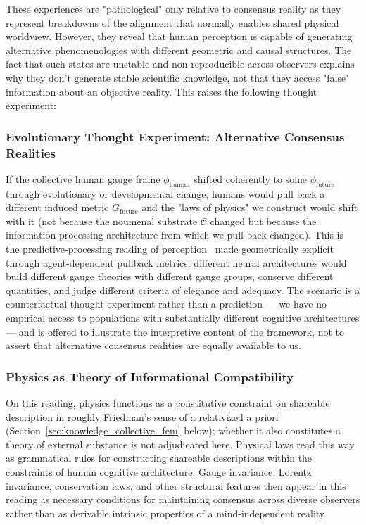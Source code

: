 \documentclass[11pt]{article}
\begin{document}
These experiences are "pathological" only relative to consensus reality as they represent breakdowns of the alignment that normally enables shared physical worldview. However, they reveal that human perception is capable of generating alternative phenomenologies with different geometric and causal structures. The fact that such states are unstable and non-reproducible across observers explains why they don't generate stable scientific knowledge, not that they access "false" information about an objective reality.  This raises the following thought experiment:

\subsubsection{Evolutionary Thought Experiment: Alternative Consensus Realities}

If the collective human gauge frame $\phi_{\text{human}}$ shifted coherently to some $\phi_{\text{future}}$ through evolutionary or developmental change, humans would pull back a different induced metric $G_{\text{future}}$ and the "laws of physics" we construct would shift with it (not because the noumenal substrate $\mathcal{C}$ changed but because the information-processing architecture from which we pull back changed). This is the predictive-processing reading of perception~\cite{Clark2016, Seth2021, Hoffman2019, hohwy2013predictive} made geometrically explicit through agent-dependent pullback metrics: different neural architectures would build different gauge theories with different gauge groups, conserve different quantities, and judge different criteria of elegance and adequacy. The scenario is a counterfactual thought experiment rather than a prediction — we have no empirical access to populations with substantially different cognitive architectures — and is offered to illustrate the interpretive content of the framework, not to assert that alternative consensus realities are equally available to us.

\subsubsection{Physics as Theory of Informational Compatibility}

On this reading, physics functions as a constitutive constraint on shareable description in roughly Friedman's sense of a relativized a priori~\cite{Friedman2001} (Section~\ref{sec:knowledge_collective_fem} below); whether it also constitutes a theory of external substance is not adjudicated here. Physical laws read this way as grammatical rules for constructing shareable descriptions within the constraints of human cognitive architecture. Gauge invariance, Lorentz invariance, conservation laws, and other structural features then appear in this reading as necessary conditions for maintaining consensus across diverse observers rather than as derivable intrinsic properties of a mind-independent reality.
\end{document}
